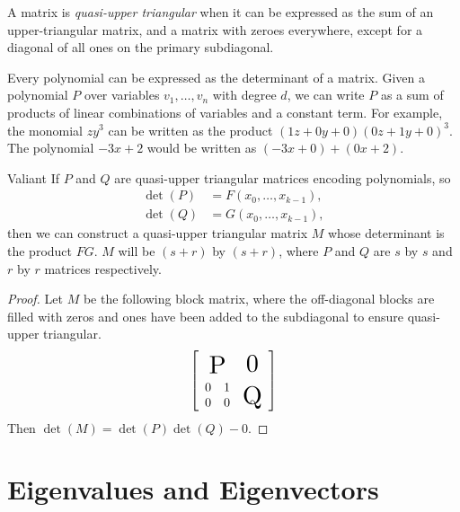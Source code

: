 \begin{defn}
    A matrix is \emph{quasi-upper triangular} when it can be expressed as the sum of an upper-triangular matrix, and a matrix with zeroes everywhere, except for a diagonal of all ones on the primary subdiagonal.
\end{defn}

\begin{rmk}
    Every polynomial can be expressed as the determinant of a matrix. Given a polynomial $P$ over variables $v_1, \ldots, v_n$ with degree $d$, we can write $P$ as a sum of products of linear combinations of variables and a constant term. For example, the monomial $zy^3$ can be written as the product $(1z + 0y + 0)(0z + 1y + 0)^3$. The polynomial $-3x + 2$ would be written as $(-3x + 0) + (0x + 2)$.
\end{rmk}

\begin{thm}{Valiant}\label{thm:valiant-determinant}\proofbreak
    If $P$ and $Q$ are quasi-upper triangular matrices encoding polynomials, so
    \begin{align*}
        \det(P) &= F(x_0, \ldots, x_{k-1}),\\
        \det(Q) &= G(x_0, \ldots, x_{k-1}),
    \end{align*}
    then we can construct a quasi-upper triangular matrix $M$ whose determinant is the product $FG$. $M$ will be $(s+r)$ by $(s+r)$, where $P$ and $Q$ are $s$ by $s$ and $r$ by $r$ matrices respectively.
\end{thm}

\begin{proof}
    Let $M$ be the following block matrix, where the off-diagonal blocks are filled with zeros and ones have been added to the subdiagonal to ensure quasi-upper triangular.
    \begin{align*}
        \left[\begin{array}{cccc}
            \largeblock{2}{-0.7}{P} & \largeblock{2}{-0.7}{0} \\
            & & & \\
            0& 1& & \\
            0 & 0& \largeblock{2}{0.7}{Q} \\
        \end{array}\right]
    \end{align*}
    Then $\det(M) = \det(P)\det(Q) - 0$.
\end{proof}

\section{Eigenvalues and Eigenvectors}

